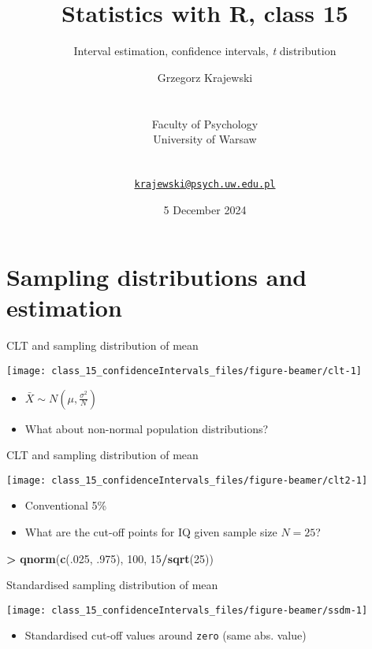 \documentclass[
  ignorenonframetext,
]{beamer}
\title{Statistics with R, class 15}
\subtitle{Interval estimation, confidence intervals, \emph{t}
distribution}
\author{Grzegorz Krajewski\\
\strut \\
Faculty of Psychology\\
University of Warsaw\\
\strut \\
\href{mailto:krajewski@psych.uw.edu.pl}{\nolinkurl{krajewski@psych.uw.edu.pl}}}
\date{5 December 2024}
\newenvironment{Shaded}{\begin{snugshade}}{\end{snugshade}}
\newcommand{\DecValTok}[1]{\textcolor[rgb]{0.00,0.00,0.81}{#1}}
\newcommand{\FunctionTok}[1]{\textcolor[rgb]{0.13,0.29,0.53}{\textbf{#1}}}
\newcommand{\NormalTok}[1]{#1}
\newcommand{\SpecialCharTok}[1]{\textcolor[rgb]{0.81,0.36,0.00}{\textbf{#1}}}
\providecommand{\tightlist}{%
  \setlength{\itemsep}{0pt}\setlength{\parskip}{0pt}}
\begin{document}
\frame{\titlepage}

\section{Sampling distributions and
estimation}\label{sampling-distributions-and-estimation}

\begin{frame}{CLT and sampling distribution of mean}
\label{clt-and-sampling-distribution-of-mean}
\begin{center}\texttt{[image: class\_15\_confidenceIntervals\_files/figure-beamer/clt-1]} \end{center}

\begin{itemize}
\tightlist
\item
  \(\bar{X} \sim N\left(\mu, \frac{\sigma^2}{N}\right)\)
\item
  What about non-normal population distributions?
\end{itemize}
\end{frame}

\begin{frame}[fragile]{CLT and sampling distribution of mean}
\label{clt-and-sampling-distribution-of-mean-1}
\begin{center}\texttt{[image: class\_15\_confidenceIntervals\_files/figure-beamer/clt2-1]} \end{center}

\begin{itemize}
\tightlist
\item
  Conventional 5\%
\item
  What are the cut-off points for IQ given sample size \(N = 25\)?
\end{itemize}

\begin{Shaded}
\begin{Highlighting}[]
\SpecialCharTok{\textgreater{}} \FunctionTok{qnorm}\NormalTok{(}\FunctionTok{c}\NormalTok{(.}\DecValTok{025}\NormalTok{, .}\DecValTok{975}\NormalTok{), }\DecValTok{100}\NormalTok{, }\DecValTok{15}\SpecialCharTok{/}\FunctionTok{sqrt}\NormalTok{(}\DecValTok{25}\NormalTok{))}
\end{Highlighting}
\end{Shaded}
\end{frame}

\begin{frame}[fragile]{Standardised sampling distribution of mean}
\label{standardised-sampling-distribution-of-mean}
\begin{center}\texttt{[image: class\_15\_confidenceIntervals\_files/figure-beamer/ssdm-1]} \end{center}

\begin{itemize}
\tightlist
\item
  Standardised cut-off values around \texttt{zero} (same abs. value)
\end{itemize}
\end{frame}
\end{document}
